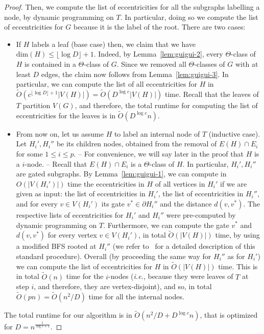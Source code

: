 \documentclass{article}
\begin{document}
\begin{proof}
Then, we compute the list of eccentricities for all the subgraphs labelling a node, by dynamic programming on $T$. 
In particular, doing so we compute the list of eccentricities for $G$ because it is the label of the root.
There are two cases:
\begin{itemize}
    \item If $H$ labels a leaf (base case) then, we claim that we have $\mbox{dim}(H) \leq \lfloor \log{D} \rfloor + 1$.
Indeed, by Lemma~\ref{lem:guigui-2}, every $\Theta$-class of $H$ is contained in a $\Theta$-class of $G$.
Since we removed all $\Theta$-classes of $G$ with at least $D$ edges, the claim now follows from Lemma~\ref{lem:guigui-3}.
In particular, we can compute the list of all eccentricities for $H$ in $\tilde{O}(c^{\lfloor \log{D} \rfloor + 1}|V(H)|) = \tilde{O}(D^{\log{c}}|V(H)|)$ time.
Recall that the leaves of $T$ partition $V(G)$, and therefore, the total runtime for computing the list of eccentricities for the leaves is in $\tilde{O}(D^{\log{c}}n)$.
    \item From now on, let us assume $H$ to label an internal node of $T$ (inductive case).
Let $H_i',H_i''$ be its children nodes, obtained from the removal of $E(H) \cap E_i$ for some $1 \leq i \leq p$.
-- For convenience, we will say later in the proof that $H$ is a $i$-node. --
Recall that $E(H) \cap E_i$ is a $\Theta$-class of $H$.
In particular, $H_i',H_i''$ are gated subgraphs.
By Lemma~\ref{lem:guigui-1}, we can compute in ${O}(|V(H_i')|)$ time the eccentricities in $H$ of all vertices in $H_i'$ if we are given as input: the list of eccentricities in $H_i'$, the list of eccentricities in $H_i''$, and for every $v \in V(H_i')$ its gate $v^* \in \partial H_i''$ and the distance $d(v,v^*)$. 
The respective lists of eccentricities for $H_i'$ and $H_i''$ were pre-computed by dynamic programming on $T$.
Furthermore, we can compute the gate $v^*$ and $d(v,v^*)$ for every vertex $v \in V(H_i')$, in total $\tilde{O}(|V(H)|)$ time, by using a modified BFS rooted at $H_i''$ (we refer to~\cite[Lemma 17]{ChLaRa19} for a detailed description of this standard procedure).
Overall (by proceeding the same way for $H_i''$ as for $H_i'$) we can compute the list of eccentricities for $H$ in $\tilde{O}(|V(H)|)$ time.
This is in total $\tilde{O}(n)$ time for the $i$-nodes ({\it i.e.}, because they were leaves of $T$ at step $i$, and therefore, they are vertex-disjoint), and so, in total $\tilde{O}(pn) = \tilde{ O}(n^2/D)$ time for all the internal nodes.
\end{itemize}
The total runtime for our algorithm is in $\tilde{O}(n^2/D + D^{\log{c}}n)$, that is optimized for $D = n^{\frac 1 {\log{c}+1}}$.
\end{proof}
\end{document}
